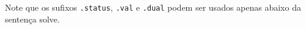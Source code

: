 \documentclass[11pt, brazil]{report}
\begin{document}
Note que os sufixos {\tt.status}, {\tt.val} e {\tt.dual} podem ser usados
apenas abaixo da sentença solve.


%
%
%
%
%
%
\end{document}
